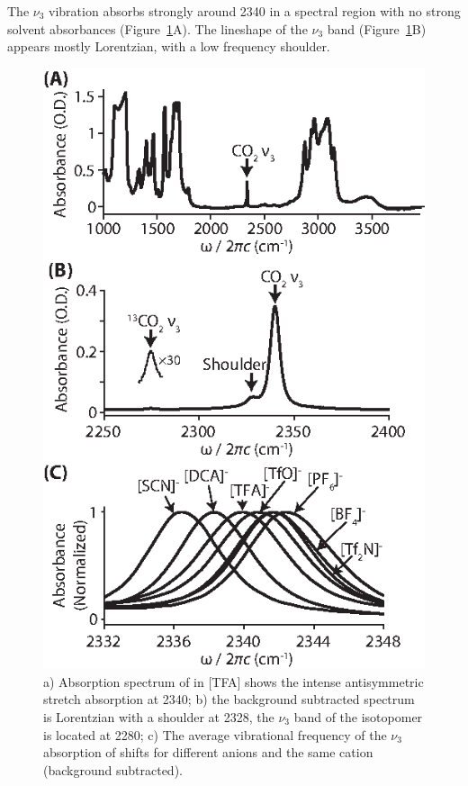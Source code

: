 \documentclass[%
  class = book,%
  crop = false,%
  float = true,%
  multi = true,%
  preview = false,%
]{standalone}
\begin{document}
{The \(\nu_3\) vibration absorbs strongly around \SI{2340}{\wavenumber} in a spectral region with no strong solvent absorbances (Figure~\ref{fig:FTIR}A). The lineshape of the \(\nu_3\) band (Figure~\ref{fig:FTIR}B) appears mostly Lorentzian, with a low frequency shoulder.
\begin{figure}
  \centering
  \includegraphics[scale=1.40]{fig2.eps}
  \caption[FTIR of \texorpdfstring{}{carbon dioxide} in ionic liquids]{\label{fig:FTIR} a) Absorption spectrum of  in \ce{[Im_{4,1}]}[TFA] shows the intense antisymmetric stretch absorption at \SI{2340}{\wavenumber}; b) the background subtracted spectrum is Lorentzian with a shoulder at \SI{2328}{\wavenumber}, the \(\nu_3\) band of the  isotopomer is located at \SI{2280}{\wavenumber}; c) The average vibrational frequency of the \(\nu_3\) absorption of  shifts for different anions and the same \ce{[Im_{4,1}^+]} cation (background subtracted).}
\end{figure}

}
\end{document}
